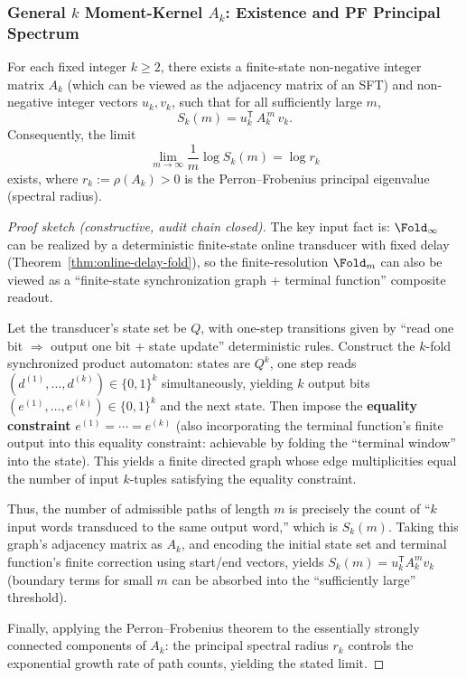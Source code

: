 \subsubsection{General \texorpdfstring{$k$}{k} Moment-Kernel \texorpdfstring{$A_k$}{Ak}: Existence and PF Principal Spectrum}\label{subsec:pom-ak-existence}
\begin{theorem}\label{thm:pom-collision-kernel-ak}
For each fixed integer $k\ge 2$, there exists a finite-state non-negative integer matrix $A_k$ (which can be viewed as the adjacency matrix of an SFT) and non-negative integer vectors $u_k,v_k$, such that for all sufficiently large $m$,
\[
S_k(m)=u_k^{\mathsf T}\,A_k^{\,m}\,v_k.
\]
Consequently, the limit
\[
\lim_{m\to\infty}\frac{1}{m}\log S_k(m)=\log r_k
\]
exists, where $r_k:=\rho(A_k)>0$ is the Perron--Frobenius principal eigenvalue (spectral radius).
\end{theorem}
\begin{proof}[Proof sketch (constructive, audit chain closed)]
The key input fact is: $\Fold_\infty$ can be realized by a deterministic finite-state online transducer with fixed delay (Theorem~\ref{thm:online-delay-fold}), so the finite-resolution $\Fold_m$ can also be viewed as a ``finite-state synchronization graph + terminal function'' composite readout.

Let the transducer's state set be $Q$, with one-step transitions given by ``read one bit $\Rightarrow$ output one bit + state update'' deterministic rules. Construct the $k$-fold synchronized product automaton: states are $Q^k$, one step reads $(d^{(1)},\dots,d^{(k)})\in\{0,1\}^k$ simultaneously, yielding $k$ output bits $(e^{(1)},\dots,e^{(k)})\in\{0,1\}^k$ and the next state. Then impose the \textbf{equality constraint} $e^{(1)}=\cdots=e^{(k)}$ (also incorporating the terminal function's finite output into this equality constraint: achievable by folding the ``terminal window'' into the state). This yields a finite directed graph whose edge multiplicities equal the number of input $k$-tuples satisfying the equality constraint.

Thus, the number of admissible paths of length $m$ is precisely the count of ``$k$ input words transduced to the same output word,'' which is $S_k(m)$. Taking this graph's adjacency matrix as $A_k$, and encoding the initial state set and terminal function's finite correction using start/end vectors, yields $S_k(m)=u_k^{\mathsf T}A_k^{m}v_k$ (boundary terms for small $m$ can be absorbed into the ``sufficiently large'' threshold).

Finally, applying the Perron--Frobenius theorem to the essentially strongly connected components of $A_k$: the principal spectral radius $r_k$ controls the exponential growth rate of path counts, yielding the stated limit.
\end{proof}

